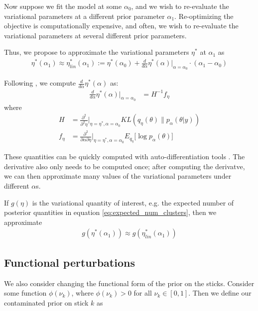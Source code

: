 \documentclass[a4paper]{article}
\begin{document}
Now suppose we fit the model at some $\alpha_0$, and we wish to
re-evaluate the variational parameters at a different prior parameter $\alpha_1$.
Re-optimizing the objective is computationally expensive, and often, we
wish to re-evaluate the variational parameters at several different prior parameters.

Thus, we propose to approximate the variational parameters $\eta^*$ at $\alpha_1$ as
\begin{align}
    \eta^*(\alpha_1) \approx \eta^*_{lin}(\alpha_1)
    := \eta^*(\alpha_0) + \frac{d}{d\alpha}\eta^*(\alpha)\Big|_{\alpha=\alpha_0} \cdot (\alpha_1 - \alpha_0)
    \label{eq:our_approximation}
\end{align}

Following \cite{giordano:2017:covariances},  we compute $\frac{d}{d\alpha}\eta^*(\alpha) $ as:
\begin{align}
  \frac{d}{d\alpha}\eta^*(\alpha)\Big|_{\alpha=\alpha_0} &= H^{-1} f_\eta \label{eq:vb_sensitivty}
\end{align}
where
\begin{align}
  H &= \frac{\partial^2}{\partial^2\eta}\Big\rvert_{\eta = \eta^*, \alpha = \alpha_0}
  KL(q_\eta\left(\theta\right) \| p_\alpha(\theta | y)) \\
  f_\eta &= \frac{\partial^2}{\partial \alpha \partial \eta}\Big\rvert_{\eta = \eta^*, \alpha = \alpha_0} E_{q_{\eta}} \big[\log p_\alpha(\theta)\big]
\end{align}

These quantities can be quickly computed with auto-differentiation tools \cite{maclaurin:2015:autograd}.
The derivative also only needs to be computed once; after computing the derivatve,
we can then approximate many values of
the variational parameters under different $\alpha$s.

If $g(\eta)$ is the variational quantity of interest,
e.g. the expected number of posterior quantities in equation \ref{eq:expected_num_clusters},
then we approximate
\begin{align}
    g(\eta^*(\alpha_1)) \approx g(\eta^*_{lin}(\alpha_1))
\end{align}

\subsection{Functional perturbations}
\label{sec:func_pert}
We also consider changing the functional form of the prior on the sticks.
Consider some function $\phi(\nu_k)$, where $\phi(\nu_k) > 0$ for all $\nu_k \in [0, 1]$.
Then we define our contaminated prior on stick $k$ as
\end{document}
